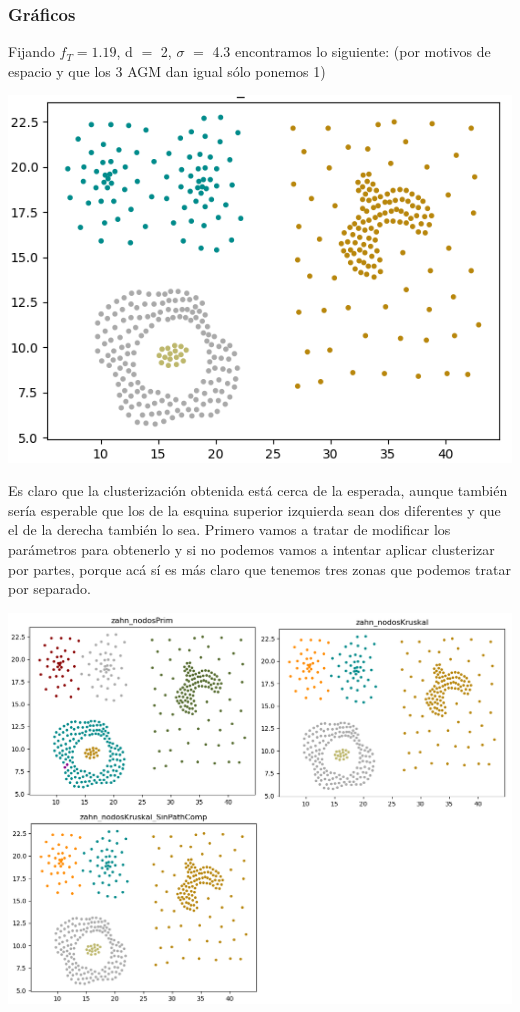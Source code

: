 \documentclass[11pt,a4paper]{article}
\begin{document}
\subsubsection{Gráficos}
Fijando $f_{T} = 1.19$, d $=$ 2, $\sigma$ $=$ 4.3 encontramos lo siguiente: (por motivos de espacio y que los 3 AGM dan igual sólo ponemos 1)
\begin{center}
\includegraphics[scale=.6]{graficos/zahn.png}
\end{center}
Es claro que la clusterización obtenida está cerca de la esperada, aunque también sería esperable que los de la esquina superior izquierda sean dos diferentes y que el de la derecha también lo sea. Primero vamos a tratar de modificar los parámetros para obtenerlo y si no podemos vamos a intentar aplicar clusterizar por partes, porque acá sí es más claro que tenemos tres zonas que podemos tratar por separado.
\begin{center}
\includegraphics[scale=.55]{graficos/zahn_nodosPrim_Kruskal.png}
\end{center}
\end{document}
